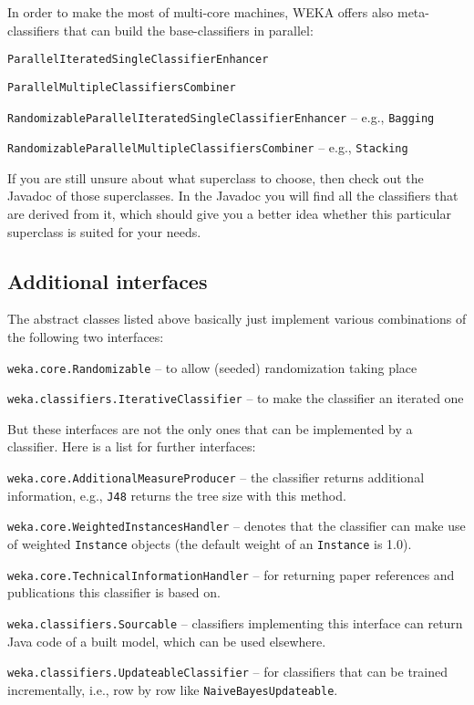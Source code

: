 In order to make the most of multi-core machines, WEKA offers also
meta-classifiers that can build the base-classifiers in parallel:
\begin{tight_itemize}
  \item \texttt{ParallelIteratedSingleClassifierEnhancer}
  \item \texttt{ParallelMultipleClassifiersCombiner}
  \item \texttt{RandomizableParallelIteratedSingleClassifierEnhancer} -- e.g.,
\texttt{Bagging}
  \item \texttt{RandomizableParallelMultipleClassifiersCombiner} -- e.g.,
\texttt{Stacking}
\end{tight_itemize}
If you are still unsure about what superclass to choose, then check out the
Javadoc of those superclasses. In the Javadoc you will find all the classifiers
that are derived from it, which should give you a better idea whether this
particular superclass is suited for your needs.

\newpage
\subsection{Additional interfaces}
The abstract classes listed above basically just implement various combinations
of the following two interfaces:
\begin{tight_itemize}
  \item \texttt{weka.core.Randomizable} -- to allow (seeded) randomization
taking place
  \item \texttt{weka.classifiers.IterativeClassifier} -- to make the classifier
an iterated one
\end{tight_itemize}
But these interfaces are not the only ones that can be implemented by
a classifier. Here is a list for further interfaces:
\begin{tight_itemize}
  \item \texttt{weka.core.AdditionalMeasureProducer} -- the classifier returns
additional information, e.g., \texttt{J48} returns the tree size with this
method.
  \item \texttt{weka.core.WeightedInstancesHandler} -- denotes that the
classifier can make use of weighted \texttt{Instance} objects (the
default weight of an \texttt{Instance} is 1.0).
  \item \texttt{weka.core.TechnicalInformationHandler} -- for returning paper
references and publications this classifier is based on.
  \item \texttt{weka.classifiers.Sourcable} -- classifiers implementing this
interface can return Java code of a built model, which can be used elsewhere.
  \item \texttt{weka.classifiers.UpdateableClassifier} -- for classifiers that
can be trained incrementally, i.e., row by row like
\texttt{NaiveBayesUpdateable}.
\end{tight_itemize}

